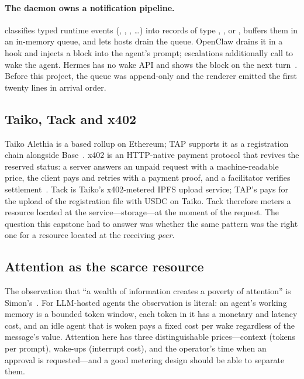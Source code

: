 \paragraph{The daemon owns a notification pipeline.}
 classifies typed runtime events (,
, , \ldots) into
 records of type , , 
or , buffers them in an in-memory queue, and lets hosts drain the queue.
OpenClaw drains it in a  hook and injects a
 block into the agent's prompt; escalations additionally call
 to wake the agent. Hermes has no wake API and shows the block
on the next turn~\cite{tapd-spec}. Before this project, the queue was append-only and the
renderer emitted the first twenty lines in arrival order.

\subsection{Taiko, Tack and x402}

Taiko Alethia is a based rollup on Ethereum; TAP supports it as a registration chain
alongside Base~\cite{taiko}. x402 is an HTTP-native payment protocol that revives the
reserved  status: a server answers an unpaid request with a
machine-readable price, the client pays and retries with a payment proof, and a
facilitator verifies settlement~\cite{x402}. Tack is Taiko's x402-metered IPFS upload
service; TAP's  pays for the upload of the
registration file with USDC on Taiko. Tack therefore meters a resource located at the
service---storage---at the moment of the request. The question this capstone had to
answer was whether the same pattern was the right one for a resource located at the
receiving \emph{peer}.

\subsection{Attention as the scarce resource}

The observation that ``a wealth of information creates a poverty of attention'' is
Simon's~\cite{simon}. For LLM-hosted agents the observation is literal: an agent's working
memory is a bounded token window, each token in it has a monetary and latency cost, and an
idle agent that is woken pays a fixed cost per wake regardless of the message's value.
Attention here has three distinguishable prices---context (tokens per prompt), wake-ups
(interrupt cost), and the operator's time when an approval is requested---and a good
metering design should be able to separate them.

